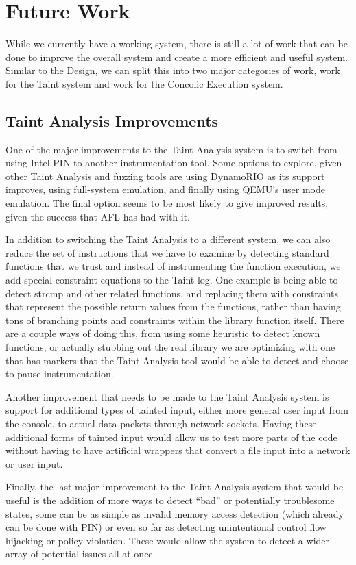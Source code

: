 \chapter{Future Work}
While we currently have a working system, there is still a lot of work that can
be done to improve the overall system and create a more efficient and useful
system. Similar to the Design, we can split this into two major categories of
work, work for the Taint system and work for the Concolic Execution system.

\section{Taint Analysis Improvements}
One of the major improvements to the Taint Analysis system is to switch from
using Intel PIN to another instrumentation tool. Some options to explore, given
other Taint Analysis and fuzzing tools are using DynamoRIO as its support
improves, using full-system emulation, and finally using QEMU's user mode
emulation. The final option seems to be most likely to give improved results,
given the success that AFL has had with it.

In addition to switching the Taint Analysis to a different system, we can also
reduce the set of instructions that we have to examine by detecting standard
functions that we trust and instead of instrumenting the function execution, we
add special constraint equations to the Taint log. One example is being able to
detect strcmp and other related functions, and replacing them with constraints
that represent the possible return values from the functions, rather than having
tons of branching points and constraints within the library function
itself. There are a couple ways of doing this, from using some heuristic to
detect known functions, or actually stubbing out the real library we are
optimizing with one that has markers that the Taint Analysis tool would be able
to detect and choose to pause instrumentation.

Another improvement that needs to be made to the Taint Analysis system is
support for additional types of tainted input, either more general user input
from the console, to actual data packets through network sockets. Having these
additional forms of tainted input would allow us to test more parts of the code
without having to have artificial wrappers that convert a file input into a
network or user input.

Finally, the last major improvement to the Taint Analysis system that would be
useful is the addition of more ways to detect ``bad'' or potentially troublesome
states, some can be as simple as invalid memory access detection (which already
can be done with PIN) or even so far as detecting unintentional control flow
hijacking or policy violation. These would allow the system to detect a wider
array of potential issues all at once.

